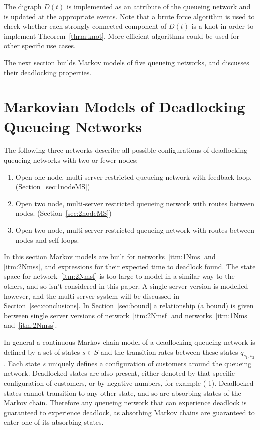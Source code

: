 \documentclass{article}
\numberwithin{equation}{section}
\begin{document}
The digraph \(D(t)\) is implemented as an attribute of the queueing network
and is updated at the appropriate events.
Note that a brute force algorithm is used to check whether each strongly
connected component of $D(t)$ is a knot in order to implement
Theorem~\ref{thrm:knot}.
More efficient algorithms could be used for other specific use cases.

The next section builds Markov models of five queueing networks, and discusses
their deadlocking properties.


\section{Markovian Models of Deadlocking Queueing Networks}\label{sec:markovmodels}

The following three networks describe all possible configurations of 
deadlocking queueing networks with two or fewer nodes:

\begin{enumerate}
  \item Open one node, multi-server restricted queueing network with feedback
  loop. (Section~\ref{sec:1nodeMS}) \label{itm:1Nms}
  \item Open two node, multi-server restricted queueing network with routes
  between nodes. (Section~\ref{sec:2nodeMS}) \label{itm:2Nmss}
  \item Open two node, multi-server restricted queueing network with routes
  between nodes and self-loops. \label{itm:2Nmsf}
\end{enumerate}

In this section Markov models are built for networks~\ref{itm:1Nms} and
\ref{itm:2Nmss}, and expressions for their expected time to deadlock found.
The state space for network~\ref{itm:2Nmsf} is too large to model in a similar
way to the others, and so isn't considered in this paper.
A single server version is modelled however, and the multi-server system will
be discussed in Section~\ref{sec:conclusions}.
In Section~\ref{sec:bound} a relationship (a bound) is given between single
server versions of network~\ref{itm:2Nmsf} and networks~\ref{itm:1Nms}
and~\ref{itm:2Nmss}.

In general a continuous Markov chain model of a deadlocking queueing network
is defined by a set of states $s \in S$ and the transition rates between these
states $q_{s_1,s_2}$.
Each state $s$ uniquely defines a configuration of customers around the
queueing network.
Deadlocked states are also present, either denoted by that specific
configuration of customers, or by negative numbers, for example (-1).
Deadlocked states cannot transition to any other state, and so are absorbing
states of the Markov chain.
Therefore any queueing network that can experience deadlock is guaranteed to
experience deadlock, as absorbing Markov chains are guaranteed to enter one of
its absorbing states.
\end{document}
